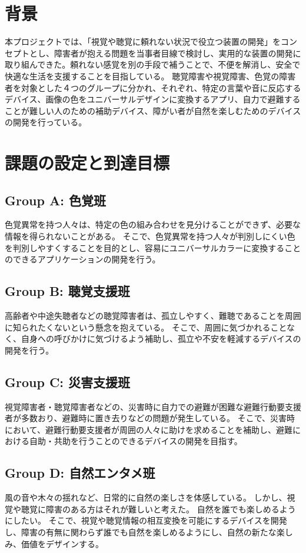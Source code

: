 \section{背景}
本プロジェクトでは、「視覚や聴覚に頼れない状況で役立つ装置の開発」をコンセプトとし、障害者が抱える問題を当事者目線で検討し、実用的な装置の開発に取り組んできた。頼れない感覚を別の手段で補うことで、不便を解消し、安全で快適な生活を支援することを目指している。
聴覚障害や視覚障害、色覚の障害者を対象とした４つのグループに分かれ、それぞれ、特定の言葉や音に反応するデバイス、画像の色をユニバーサルデザインに変換するアプリ、自力で避難することが難しい人のための補助デバイス、障がい者が自然を楽しむためのデバイスの開発を行っている。

\section{課題の設定と到達目標}
\subsection{Group A: 色覚班}
色覚異常を持つ人々は、特定の色の組み合わせを見分けることができず、必要な情報を得られないことがある。
そこで、色覚異常を持つ人々が判別しにくい色を判別しやすくすることを目的とし、容易にユニバーサルカラーに変換することのできるアプリケーションの開発を行う。

\subsection{Group B: 聴覚支援班}
高齢者や中途失聴者などの聴覚障害者は、孤立しやすく、難聴であることを周囲に知られたくないという懸念を抱えている。
そこで、周囲に気づかれることなく、自身への呼びかけに気づけるよう補助し、孤立や不安を軽減するデバイスの開発を行う。

\subsection{Group C: 災害支援班}
視覚障害者・聴覚障害者などの、災害時に自力での避難が困難な避難行動要支援者が多数おり、避難時に置き去りなどの問題が発生している。
そこで、災害時において、避難行動要支援者が周囲の人々に助けを求めることを補助し、避難における自助・共助を行うことのできるデバイスの開発を目指す。

\subsection{Group D: 自然エンタメ班}
風の音や木々の揺れなど、日常的に自然の楽しさを体感している。
しかし、視覚や聴覚に障害のある方はそれが難しいと考えた。
自然を誰でも楽しめるようにしたい。
そこで、視覚や聴覚情報の相互変換を可能にするデバイスを開発し、障害の有無に関わらず誰でも自然を楽しめるようにし、自然の新たな楽しみ、価値をデザインする。

